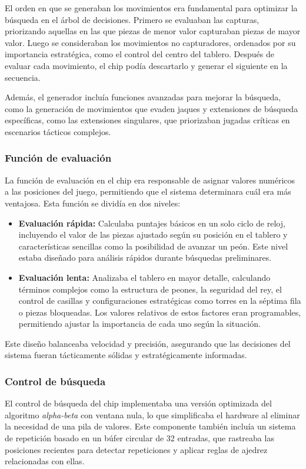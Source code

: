 \documentclass[12pt,a4paper]{article}
\begin{document}
El orden en que se generaban los movimientos era fundamental para optimizar la búsqueda en el árbol de decisiones. Primero se evaluaban las capturas, priorizando aquellas en las que piezas de menor valor capturaban piezas de mayor valor. Luego se consideraban los movimientos no capturadores, ordenados por su importancia estratégica, como el control del centro del tablero. Después de evaluar cada movimiento, el chip podía descartarlo y generar el siguiente en la secuencia.

Además, el generador incluía funciones avanzadas para mejorar la búsqueda, como la generación de movimientos que evaden jaques y extensiones de búsqueda específicas, como las extensiones singulares, que priorizaban jugadas críticas en escenarios tácticos complejos.

\subsubsection*{Función de evaluación}
La función de evaluación en el chip era responsable de asignar valores numéricos a las posiciones del juego, permitiendo que el sistema determinara cuál era más ventajosa. Esta función se dividía en dos niveles:
\begin{itemize}
    \item \textbf{Evaluación rápida:} Calculaba puntajes básicos en un solo ciclo de reloj, incluyendo el valor de las piezas ajustado según su posición en el tablero y características sencillas como la posibilidad de avanzar un peón. Este nivel estaba diseñado para análisis rápidos durante búsquedas preliminares.
    \item \textbf{Evaluación lenta:} Analizaba el tablero en mayor detalle, calculando términos complejos como la estructura de peones, la seguridad del rey, el control de casillas y configuraciones estratégicas como torres en la séptima fila o piezas bloqueadas. Los valores relativos de estos factores eran programables, permitiendo ajustar la importancia de cada uno según la situación.
\end{itemize}

Este diseño balanceaba velocidad y precisión, asegurando que las decisiones del sistema fueran tácticamente sólidas y estratégicamente informadas.

\subsubsection*{Control de búsqueda}
El control de búsqueda del chip implementaba una versión optimizada del algoritmo \textit{alpha-beta} con ventana nula, lo que simplificaba el hardware al eliminar la necesidad de una pila de valores. Este componente también incluía un sistema de repetición basado en un búfer circular de 32 entradas, que rastreaba las posiciones recientes para detectar repeticiones y aplicar reglas de ajedrez relacionadas con ellas.
\end{document}
